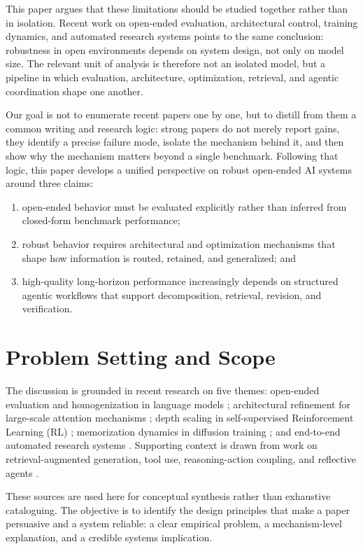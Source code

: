\documentclass[10pt,twocolumn]{article}
\begin{document}
This paper argues that these limitations should be studied together rather than in isolation. Recent work on open-ended evaluation, architectural control, training dynamics, and automated research systems points to the same conclusion: robustness in open environments depends on system design, not only on model size. The relevant unit of analysis is therefore not an isolated model, but a pipeline in which evaluation, architecture, optimization, retrieval, and agentic coordination shape one another.

Our goal is not to enumerate recent papers one by one, but to distill from them a common writing and research logic: strong papers do not merely report gains, they identify a precise failure mode, isolate the mechanism behind it, and then show why the mechanism matters beyond a single benchmark. Following that logic, this paper develops a unified perspective on robust open-ended AI systems around three claims:
\begin{enumerate}[leftmargin=1.5em]
\item open-ended behavior must be evaluated explicitly rather than inferred from closed-form benchmark performance;
\item robust behavior requires architectural and optimization mechanisms that shape how information is routed, retained, and generalized; and
\item high-quality long-horizon performance increasingly depends on structured agentic workflows that support decomposition, retrieval, revision, and verification.
\end{enumerate}

\section{Problem Setting and Scope}
The discussion is grounded in recent research on five themes: open-ended evaluation and homogenization in language models \citep{hivemind2025}; architectural refinement for large-scale attention mechanisms \citep{gated2025}; depth scaling in self-supervised Reinforcement Learning (RL) \citep{wang2025rl}; memorization dynamics in diffusion training \citep{diffusion2025}; and end-to-end automated research systems \citep{aiscientist2024,aiscientistv2_2025}. Supporting context is drawn from work on retrieval-augmented generation, tool use, reasoning-action coupling, and reflective agents \citep{lewis2020rag,schick2023toolformer,yao2023react,shinn2023reflexion}.

These sources are used here for conceptual synthesis rather than exhaustive cataloguing. The objective is to identify the design principles that make a paper persuasive and a system reliable: a clear empirical problem, a mechanism-level explanation, and a credible systems implication.
\end{document}
